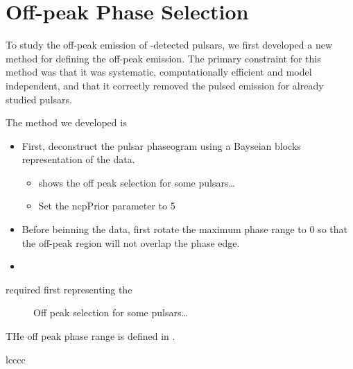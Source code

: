 \section{Off-peak Phase Selection}


To study the off-peak emission of \lat-detected pulsars, we first
developed a new method for defining the off-peak emission.
The primary constraint for this method was that it was systematic,
computationally efficient and model independent, and that it correctly
removed the pulsed emission for already studied pulsars.

The method we developed is
\begin{itemize}
  \item First, deconstruct the pulsar phaseogram 
    using a Bayseian blocks representation of the data.
    \begin{itemize}
      \item {} shows the off peak selection for some pulsars\dots
      \item Set the ncpPrior parameter to 5
    \end{itemize}
  \item Before beinning the data, first rotate the maximum phase range to 0
    so that the off-peak region will not overlap the phase edge.
  \item 
\end{itemize}
  required first representing the 


\begin{figure}
  \ifdefined\bwfigures
  \else
  \fi
  \caption{Off peak selection for some pulsars\dots}
  \label{fig:off_peak_select}
\end{figure}


THe off peak phase range is defined in .


\begin{deluxetable}{lcccc}
  \tabletypesize{\scriptsize}
  
\end{deluxetable}


